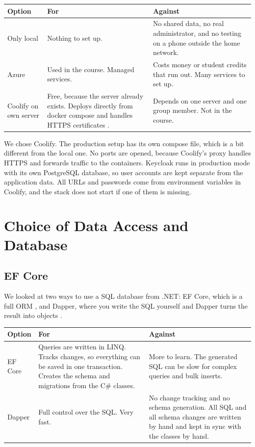 \documentclass[a4paper,11pt]{article}
\begin{document}
\begin{center}
\begin{tabular}{@{}p{3.1cm} p{5.6cm} p{5.6cm}@{}}
\textbf{Option} & \textbf{For} & \textbf{Against} \\
\hline
Only local & Nothing to set up. & No shared data, no real administrator, and no testing on a phone outside the home network. \\
\hline
Azure & Used in the course. Managed services. & Costs money or student credits that run out. Many services to set up. \\
\hline
Coolify on own server & Free, because the server already exists. Deploys directly from docker compose and handles HTTPS certificates \cite{coolify-traefik-overview}. & Depends on one server and one group member. Not in the course. \\
\hline
\end{tabular}
\end{center}

We chose Coolify. The production setup has its own compose file, which is a bit different from the local one. No ports are opened, because Coolify's proxy handles HTTPS and forwards traffic to the containers. Keycloak runs in production mode with its own PostgreSQL database, so user accounts are kept separate from the application data. All URLs and passwords come from environment variables in Coolify, and the stack does not start if one of them is missing.

\section{Choice of Data Access and Database}
\label{sec:data}

\subsection{EF Core}
We looked at two ways to use a SQL database from .NET: EF Core, which is a full ORM \cite[sec.~4.3]{desanctis-web-apis-aspnet-core}, and Dapper, where you write the SQL yourself and Dapper turns the result into objects \cite{dapperlib-dapper}.
\begin{center}
\begin{tabular}{@{}p{3.1cm} p{5.6cm} p{5.6cm}@{}}
\textbf{Option} & \textbf{For} & \textbf{Against} \\
\hline
EF Core & Queries are written in LINQ. Tracks changes, so everything can be saved in one transaction. Creates the schema and migrations from the C\# classes. & More to learn. The generated SQL can be slow for complex queries and bulk inserts. \\
\hline
Dapper & Full control over the SQL. Very fast. & No change tracking and no schema generation. All SQL and all schema changes are written by hand and kept in sync with the classes by hand. \\
\hline
\end{tabular}
\end{center}
\end{document}
